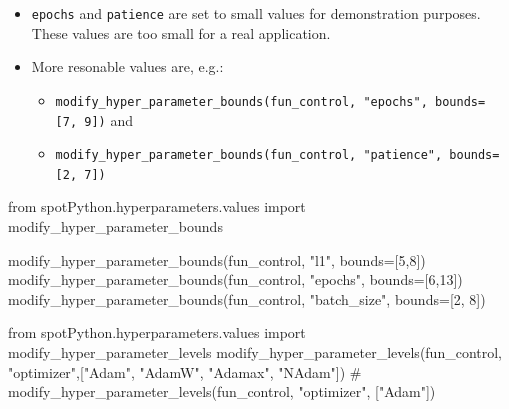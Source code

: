 \documentclass[
  letterpaper,
  DIV=11,
  numbers=noendperiod]{scrreprt}
\newenvironment{Shaded}{\begin{snugshade}}{\end{snugshade}}
\newcommand{\CommentTok}[1]{\textcolor[rgb]{0.37,0.37,0.37}{#1}}
\newcommand{\DecValTok}[1]{\textcolor[rgb]{0.68,0.00,0.00}{#1}}
\newcommand{\ImportTok}[1]{\textcolor[rgb]{0.00,0.46,0.62}{#1}}
\newcommand{\NormalTok}[1]{\textcolor[rgb]{0.00,0.23,0.31}{#1}}
\newcommand{\OperatorTok}[1]{\textcolor[rgb]{0.37,0.37,0.37}{#1}}
\newcommand{\StringTok}[1]{\textcolor[rgb]{0.13,0.47,0.30}{#1}}
\providecommand{\tightlist}{%
  \setlength{\itemsep}{0pt}\setlength{\parskip}{0pt}}\usepackage{longtable,booktabs,array}
\begin{document}
\begin{tcolorbox}[enhanced jigsaw, left=2mm, title=\textcolor{quarto-callout-caution-color}{\faFire}\hspace{0.5em}{Caution: Small number of epochs for demonstration purposes}, titlerule=0mm, toprule=.15mm, leftrule=.75mm, colbacktitle=quarto-callout-caution-color!10!white, colback=white, arc=.35mm, toptitle=1mm, bottomtitle=1mm, colframe=quarto-callout-caution-color-frame, bottomrule=.15mm, rightrule=.15mm, breakable, coltitle=black, opacitybacktitle=0.6, opacityback=0]

\begin{itemize}
\tightlist
\item
  \texttt{epochs} and \texttt{patience} are set to small values for
  demonstration purposes. These values are too small for a real
  application.
\item
  More resonable values are, e.g.:

  \begin{itemize}
  \tightlist
  \item
    \texttt{modify\_hyper\_parameter\_bounds(fun\_control,\ "epochs",\ bounds={[}7,\ 9{]})}
    and
  \item
    \texttt{modify\_hyper\_parameter\_bounds(fun\_control,\ "patience",\ bounds={[}2,\ 7{]})}
  \end{itemize}
\end{itemize}

\end{tcolorbox}

\begin{Shaded}
\begin{Highlighting}[]
\ImportTok{from}\NormalTok{ spotPython.hyperparameters.values }\ImportTok{import}\NormalTok{ modify\_hyper\_parameter\_bounds}

\NormalTok{modify\_hyper\_parameter\_bounds(fun\_control, }\StringTok{"l1"}\NormalTok{, bounds}\OperatorTok{=}\NormalTok{[}\DecValTok{5}\NormalTok{,}\DecValTok{8}\NormalTok{])}
\NormalTok{modify\_hyper\_parameter\_bounds(fun\_control, }\StringTok{"epochs"}\NormalTok{, bounds}\OperatorTok{=}\NormalTok{[}\DecValTok{6}\NormalTok{,}\DecValTok{13}\NormalTok{])}
\NormalTok{modify\_hyper\_parameter\_bounds(fun\_control, }\StringTok{"batch\_size"}\NormalTok{, bounds}\OperatorTok{=}\NormalTok{[}\DecValTok{2}\NormalTok{, }\DecValTok{8}\NormalTok{])}
\end{Highlighting}
\end{Shaded}

\begin{Shaded}
\begin{Highlighting}[]
\ImportTok{from}\NormalTok{ spotPython.hyperparameters.values }\ImportTok{import}\NormalTok{ modify\_hyper\_parameter\_levels}
\NormalTok{modify\_hyper\_parameter\_levels(fun\_control, }\StringTok{"optimizer"}\NormalTok{,[}\StringTok{"Adam"}\NormalTok{, }\StringTok{"AdamW"}\NormalTok{, }\StringTok{"Adamax"}\NormalTok{, }\StringTok{"NAdam"}\NormalTok{])}
\CommentTok{\# modify\_hyper\_parameter\_levels(fun\_control, "optimizer", ["Adam"])}
\end{Highlighting}
\end{Shaded}
\end{document}
